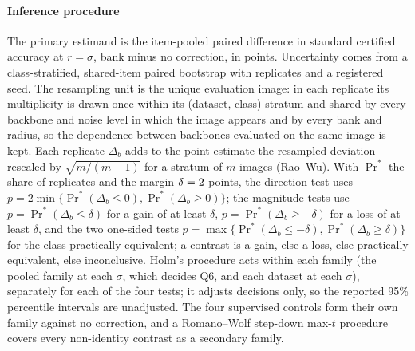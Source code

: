 \paragraph{Inference procedure}
The primary estimand is the item-pooled paired difference in standard
certified accuracy at $r=\sigma$, bank minus no correction, in points.
Uncertainty comes from a class-stratified, shared-item paired bootstrap with
\FUReplicates{} replicates and a registered seed. The resampling unit is the
unique evaluation image: in each replicate its multiplicity is drawn once
within its (dataset, class) stratum and shared by every backbone and noise
level in which the image appears and by every bank and radius, so the
dependence between backbones evaluated on the same image is kept. Each
replicate $\Delta_b$ adds to the point estimate the resampled deviation
rescaled by $\sqrt{m/(m-1)}$ for a stratum of $m$ images (Rao--Wu). With
$\Pr^*$ the share of replicates and the margin $\delta=2$ points, the
direction test uses $p=2\min\{\Pr^*(\Delta_b\le0),\Pr^*(\Delta_b\ge0)\}$; the
magnitude tests use $p=\Pr^*(\Delta_b\le\delta)$ for a gain of at least
$\delta$, $p=\Pr^*(\Delta_b\ge-\delta)$ for a loss of at least $\delta$, and
the two one-sided tests $p=\max\{\Pr^*(\Delta_b\le-\delta),\Pr^*(\Delta_b\ge\delta)\}$
for the class practically equivalent; a contrast is a gain, else a loss, else
practically equivalent, else inconclusive. Holm's procedure acts within each
family (the pooled family at each $\sigma$, which decides Q6, and each dataset
at each $\sigma$), separately for each of the four tests; it adjusts decisions
only, so the reported 95\% percentile intervals are unadjusted. The four
supervised controls form their own family against no correction, and a
Romano--Wolf step-down max-$t$ procedure covers every non-identity contrast as
a secondary family.
